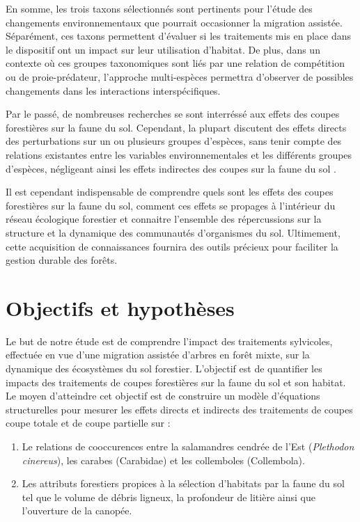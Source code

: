 En somme, les trois taxons sélectionnés sont pertinents pour l’étude des changements environnementaux que pourrait occasionner la migration assistée. 
Séparément, ces taxons permettent d’évaluer si les traitements mis en place dans le dispositif ont un impact sur leur utilisation d’habitat. 
De plus, dans un contexte où ces groupes taxonomiques sont liés par une relation de compétition ou de proie-prédateur, l’approche multi-espèces 
permettra d’observer de possibles changements dans les interactions interspécifiques.  

Par le passé, de nombreuses recherches se sont interréssé aux effets des coupes forestières sur la faune du sol. 
Cependant, la plupart discutent des effets directs des perturbations sur un ou plusieurs groupes d'espèces, 
sans tenir compte des relations existantes entre les variables environnementales et les différents groupes d'espèces, 
négligeant ainsi les effets indirectes des coupes sur la faune du sol \citep{josephIntegratingOccupancyModels2016,Kudrin2023MetaAnalysisEffects,Pollierer2021Diversityfunctional}. 

Il est cependant indispensable de comprendre quels sont les effets des coupes forestières sur la faune du sol, 
comment ces effets se propages à l'intérieur du réseau écologique forestier et connaitre l'ensemble des répercussions sur la structure 
et la dynamique des communautés d'organismes du sol. 
Ultimement, cette acquisition de connaissances fournira des outils précieux pour faciliter la gestion durable des forêts.


\section*{Objectifs et hypothèses}
\label{sec:objectifs}

Le but de notre étude est de comprendre l'impact des traitements sylvicoles, effectuée en vue d'une migration assistée d'arbres en forêt mixte, sur la dynamique des écosystèmes du sol forestier.
L'objectif est de quantifier les impacts des traitements de coupes forestières sur la faune du sol et son habitat. 
Le moyen d'atteindre cet objectif est de construire un modèle d'équations structurelles pour mesurer les effets directs et indirects des traitements de coupes coupe totale et de coupe partielle sur : 

\begin{enumerate}
    \item Le relations de cooccurences entre la salamandres cendrée de l'Est (\textit{Plethodon cinereus}), les carabes (Carabidae) et les collemboles (Collembola).
    \item Les attributs forestiers propices à la sélection d'habitats par la faune du sol tel que le volume de débris ligneux, la profondeur de litière ainsi que l'ouverture de la canopée. 
\end{enumerate}

